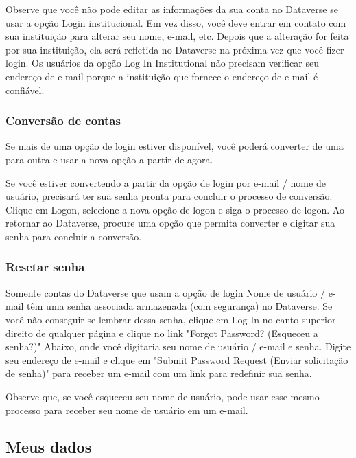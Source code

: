 \documentclass[12pt,hidelinks]{article}
\begin{document}
Observe que você não pode editar as informações da sua conta no Dataverse se usar a opção Login institucional. Em vez disso, você deve entrar em contato com sua instituição para alterar seu nome, e-mail, etc. Depois que a alteração for feita por sua instituição, ela será refletida no Dataverse na próxima vez que você fizer login. Os usuários da opção Log In Institutional  não precisam verificar seu endereço de e-mail porque a instituição que fornece o endereço de e-mail é confiável.
        
        \subsubsection{Conversão de contas}
        
        
\qquad Se mais de uma opção de login estiver disponível, você poderá converter de uma para outra e usar a nova opção a partir de agora.

Se você estiver convertendo a partir da opção de login por e-mail / nome de usuário, precisará ter sua senha pronta para concluir o processo de conversão. Clique em Logon, selecione a nova opção de logon e siga o processo de logon. Ao retornar ao Dataverse, procure uma opção que permita converter e digitar sua senha para concluir a conversão.

        \subsubsection{Resetar senha}
     	
        
\qquad Somente contas do Dataverse que usam a opção de login Nome de usuário / e-mail têm uma senha associada armazenada (com segurança) no Dataverse. Se você não conseguir se lembrar dessa senha, clique em Log In no canto superior direito de qualquer página e clique no link "Forgot Password? (Esqueceu a senha?)" Abaixo, onde você digitaria seu nome de usuário / e-mail e senha. Digite seu endereço de e-mail e clique em "Submit Password Request (Enviar solicitação de senha)" para receber um e-mail com um link para redefinir sua senha.

Observe que, se você esqueceu seu nome de usuário, pode usar esse mesmo processo para receber seu nome de usuário em um e-mail.
     	
    \subsection{Meus dados}
     	
\end{document}
